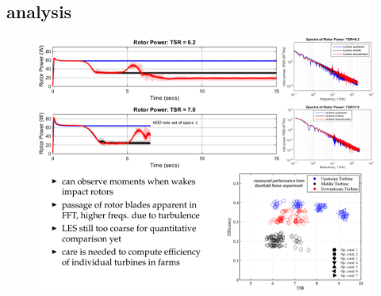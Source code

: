 \documentclass[xcolor=x11names,compress]{beamer}
\begin{document}





\subsection{analysis}
	
	\begin{frame}{}
		
		\vspace{-20pt}

		\begin{figure}[p]
		    \centering
		    \includegraphics[width=1.08\textwidth]{figures/Analysis_Slide.png}
		\end{figure}

	\end{frame}

\end{document}
